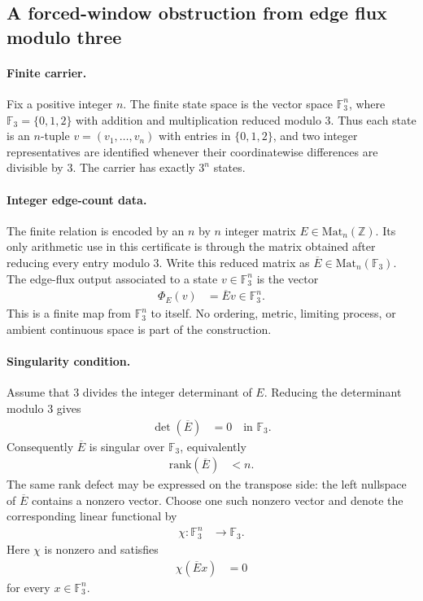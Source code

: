 
\subsection{A forced-window obstruction from edge flux modulo three}
\label{sec:f-a1-window6-edge-flux-mod3-obstruction-certificate}

\paragraph{Finite carrier.}
Fix a positive integer $n$. The finite state space is the vector space $\mathbb{F}_3^n$, where $\mathbb{F}_3=\{0,1,2\}$ with addition and multiplication reduced modulo $3$. Thus each state is an $n$-tuple $v=(v_1,\ldots,v_n)$ with entries in $\{0,1,2\}$, and two integer representatives are identified whenever their coordinatewise differences are divisible by $3$. The carrier has exactly $3^n$ states.

\paragraph{Integer edge-count data.}
The finite relation is encoded by an $n$ by $n$ integer matrix $E\in \mathrm{Mat}_n(\mathbb{Z})$. Its only arithmetic use in this certificate is through the matrix obtained after reducing every entry modulo $3$. Write this reduced matrix as $\overline{E}\in \mathrm{Mat}_n(\mathbb{F}_3)$. The edge-flux output associated to a state $v\in \mathbb{F}_3^n$ is the vector
$$
\begin{aligned}
\Phi_E(v) &= \overline{E}v \in \mathbb{F}_3^n.
\end{aligned}
$$
This is a finite map from $\mathbb{F}_3^n$ to itself. No ordering, metric, limiting process, or ambient continuous space is part of the construction.

\paragraph{Singularity condition.}
Assume that $3$ divides the integer determinant of $E$. Reducing the determinant modulo $3$ gives
$$
\begin{aligned}
\det(\overline{E}) &= 0 \quad \text{in } \mathbb{F}_3.
\end{aligned}
$$
Consequently $\overline{E}$ is singular over $\mathbb{F}_3$, equivalently
$$
\begin{aligned}
\mathrm{rank}(\overline{E}) &< n.
\end{aligned}
$$
The same rank defect may be expressed on the transpose side: the left nullspace of $\overline{E}$ contains a nonzero vector. Choose one such nonzero vector and denote the corresponding linear functional by
$$
\begin{aligned}
\chi : \mathbb{F}_3^n &\longrightarrow \mathbb{F}_3.
\end{aligned}
$$
Here $\chi$ is nonzero and satisfies
$$
\begin{aligned}
\chi(\overline{E}x) &= 0
\end{aligned}
$$
for every $x\in \mathbb{F}_3^n$.

